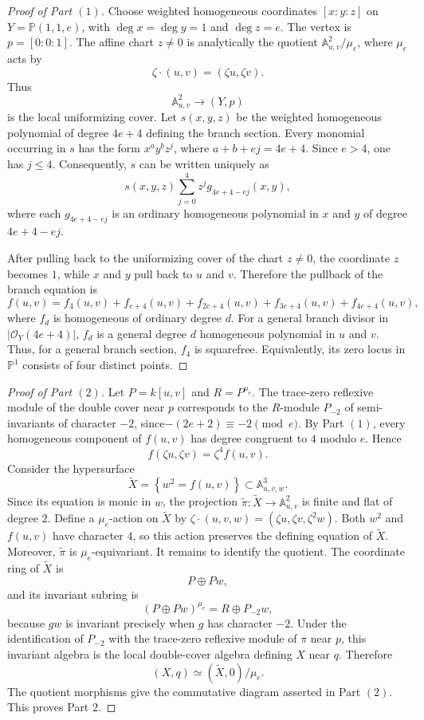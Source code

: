 \documentclass[11pt,twoside]{amsart}
\theoremstyle{plain}
\numberwithin{equation}{section}
\theoremstyle{definition}
\begin{document}
\begin{proof}[Proof of Part $(1)$]
Choose weighted homogeneous coordinates $[x:y:z]$ on
$Y=\mathbb P(1,1,e)$, with $\deg x=\deg y=1$ and $\deg z=e$. The vertex is
$p=[0:0:1]$. The affine chart $z\neq 0$ is analytically the quotient
$\mathbb A^2_{u,v}/\mu_e$, where $\mu_e$ acts by
$$
\zeta\cdot(u,v)=(\zeta u,\zeta v).
$$
Thus
$$
\mathbb A^2_{u,v}\longrightarrow (Y,p)
$$
is the local uniformizing cover.
Let $s(x,y,z)$ be the weighted homogeneous polynomial of degree $4e+4$
defining the branch section. Every monomial occurring in $s$ has the form
$x^ay^bz^j$, where $ a+b+ej=4e+4.$
Since $e>4$, one has $j\leq 4$.
Consequently, $s$ can be written uniquely as
$$
s(x,y,z)
\sum_{j=0}^{4}
z^j g_{4e+4-ej}(x,y),
$$
where each $g_{4e+4-ej}$ is an ordinary homogeneous polynomial in $x$ and
$y$ of degree $4e+4-ej$.

After pulling back to the uniformizing cover of the chart $z\neq 0$, the
coordinate $z$ becomes $1$, while $x$ and $y$ pull back to $u$ and $v$.
Therefore the pullback of the branch equation is
$$
f(u,v) =
f_4(u,v)
+
f_{e+4}(u,v)
+
f_{2e+4}(u,v)
+
f_{3e+4}(u,v)
+
f_{4e+4}(u,v),
$$
where $f_d$ is homogeneous of ordinary degree $d$. For a general branch divisor in $|\mathcal{O}_Y(4e+4)|$, $f_d$ is a general degree $d$ homogeneous polynomial in $u$ and $v$. Thus, for a
general branch section, $f_4$ is squarefree. Equivalently, its zero locus in
$\mathbb P^1$ consists of four distinct points.
\end{proof}
\begin{proof}[Proof of Part $(2)$]
Let $P=k[u,v]$ and $R=P^{\mu_e}$. The trace-zero reflexive module of the double cover near $p$ corresponds to the $R$-module $P_{-2}$ of semi-invariants of character $-2$, since$-(2e+2)\equiv -2 \pmod e.$ By Part $(1)$, every homogeneous component of $f(u,v)$ has degree congruent to $4$ modulo $e$. Hence
$$
f(\zeta u,\zeta v)=\zeta^4f(u,v).
$$
Consider the hypersurface
$$
\widetilde X = 
\left\{
w^2=f(u,v)
\right\}
\subset
\mathbb A^3_{u,v,w}.
$$
Since its equation is monic in $w$, the projection  $\widetilde\pi:\widetilde X\longrightarrow\mathbb A^2_{u,v}$ is finite and flat of degree $2$. Define a $\mu_e$-action on $\widetilde X$ by $\zeta\cdot(u,v,w) = (\zeta u,\zeta v,\zeta^2w).$ Both $w^2$ and $f(u,v)$ have character $4$, so this action preserves the defining equation of $\widetilde X$. Moreover, $\widetilde\pi$ is $\mu_e$-equivariant. It remains to identify the quotient. The coordinate ring of $\widetilde X$ is
$$
P\oplus Pw,
$$
and its invariant subring is
$$
(P\oplus Pw)^{\mu_e} =
R\oplus P_{-2}w,
$$
because $gw$ is invariant precisely when $g$ has character $-2$. Under the identification of $P_{-2}$ with the trace-zero reflexive module of $\pi$ near $p$, this invariant algebra is the local double-cover algebra defining $X$ near $q$. Therefore
$$
(X,q)
\simeq
(\widetilde X,0)/\mu_e.
$$
The quotient morphisms give the commutative diagram asserted in Part $(2)$. This proves Part $2$.

\end{proof}
\end{document}
